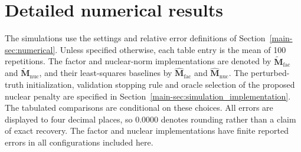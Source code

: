 \documentclass[numsec,webpdf,modern,large,namedate]{oup-authoring-template}
\theoremstyle{plain}
\theoremstyle{remark}
\newcommand{\M}{\bm{M}}
\newif\ifmarkchanges
\newenvironment{revision}{\begingroup\ifmarkchanges\color{red}\fi}{\endgroup}
\begin{document}
\section{Detailed numerical results}
\label{sec:supp_numerical}
\begin{revision}
The simulations use the settings and relative error definitions of Section~\ref{main-sec:numerical}. Unless specified otherwise, each table entry is the mean of 100 repetitions. The factor and nuclear-norm implementations are denoted by $\widetilde{\M}_{\mathrm{fac}}$ and $\widetilde{\M}_{\mathrm{nuc}}$, and their least-squares baselines by $\widehat{\M}_{\mathrm{fac}}$ and $\widehat{\M}_{\mathrm{nuc}}$. The perturbed-truth initialization, validation stopping rule and oracle selection of the proposed nuclear penalty are specified in Section~\ref{main-sec:simulation_implementation}. The tabulated comparisons are conditional on these choices.
All errors are displayed to four decimal places, so $0.0000$ denotes rounding rather than a claim of exact recovery. The factor and nuclear implementations have finite reported errors in all configurations included here.

\end{revision}
\end{document}
